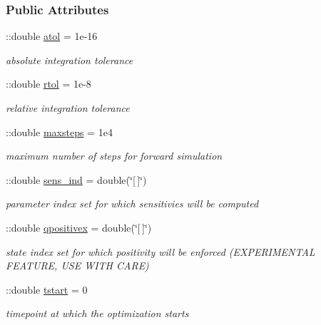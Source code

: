 \subsubsection*{Public Attributes}
\begin{DoxyCompactItemize}
\item 
\+::double \hyperlink{classamioption_a0c5f3dcf809a17b895fe12fc91272349}{atol} = 1e-\/16
\begin{DoxyCompactList}\small\item\em absolute integration tolerance \end{DoxyCompactList}\item 
\+::double \hyperlink{classamioption_a7978e9a4674f869e6b2950e2f6262ca5}{rtol} = 1e-\/8
\begin{DoxyCompactList}\small\item\em relative integration tolerance \end{DoxyCompactList}\item 
\+::double \hyperlink{classamioption_ac37622882dacee1f11688d4941ccb45e}{maxsteps} = 1e4
\begin{DoxyCompactList}\small\item\em maximum number of steps for forward simulation \end{DoxyCompactList}\item 
\+::double \hyperlink{classamioption_a0505783cf66f362672cbe3320d47a94d}{sens\+\_\+ind} = double(\char`\"{}\mbox{[}$\,$\mbox{]}\char`\"{})
\begin{DoxyCompactList}\small\item\em parameter index set for which sensitivies will be computed \end{DoxyCompactList}\item 
\+::double \hyperlink{classamioption_a8938c19fd7067f4780be8255764210b7}{qpositivex} = double(\char`\"{}\mbox{[}$\,$\mbox{]}\char`\"{})
\begin{DoxyCompactList}\small\item\em state index set for which positivity will be enforced (E\+X\+P\+E\+R\+I\+M\+E\+N\+T\+A\+L F\+E\+A\+T\+U\+R\+E, U\+S\+E W\+I\+T\+H C\+A\+R\+E) \end{DoxyCompactList}\item 
\+::double \hyperlink{classamioption_a18a69d8713604897ca9ee705d9d4fc4a}{tstart} = 0
\begin{DoxyCompactList}\small\item\em timepoint at which the optimization starts \end{DoxyCompactList}\item 

\end{DoxyCompactItemize}
